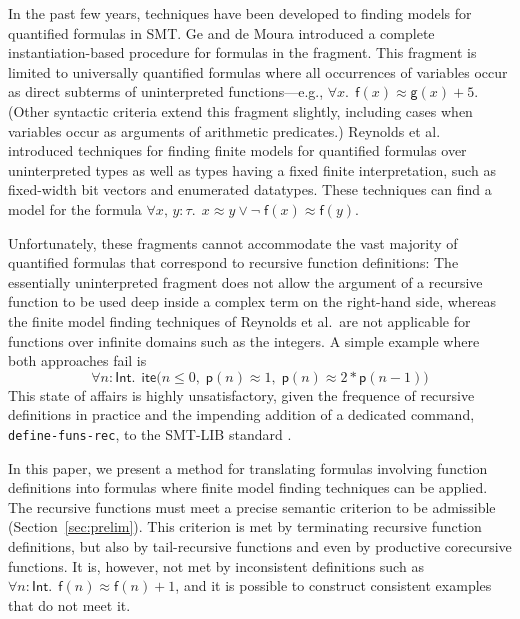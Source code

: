 \documentclass[runningheads,a4paper]{llncs}
\newcommand{\con}[1]{\mathsf{#1}}
\let\oldneg=\neg
\def\neg{\oldneg\;}
\let\oldvee=\vee
\def\vee{\mathrel{\oldvee}}
\newcommand{\teq}{\approx}
\newcommand{\sortint}{\ty{Int}}
\newcommand\ty[1]{\con{#1}}
\newcommand{\lite}{\con{ite}}
\newcommand{\vthinspace}{\kern+0.083333em}
\newcommand{\typ}[1]{^{\vthinspace #1}}
\begin{document}
In the past few years, techniques have been developed to finding models for
quantified formulas in SMT.
Ge and de Moura \cite{GeDeM-CAV-09} introduced a complete instantiation-based
procedure for formulas in the  fragment.
This fragment is limited to universally quantified formulas where all
occurrences of variables occur as direct subterms of uninterpreted
functions---e.g., $\forall x%
.\;\, \con{f}( x )
\teq \con{g}( x ) + 5$.
(Other syntactic criteria extend
this fragment slightly, including cases when variables occur as arguments of
arithmetic predicates.) Reynolds et al.\
\cite{ReyEtAl-1-RR-13,reynolds-et-al-2013} introduced techniques for finding finite
models for quantified
formulas over uninterpreted types as well as types having a fixed finite
interpretation, such as fixed-width bit vectors and enumerated datatypes.
These techniques can
find a model for the formula $\forall x,\, y : \tau.\;\, x \teq
y \vee \neg \con{f}( x ) \teq \con{f}( y )$.

Unfortunately, these fragments cannot accommodate the vast majority of
quantified formulas that correspond to recursive function definitions: The
essentially uninterpreted fragment does not allow the argument of a
recursive function to be used deep inside a complex term on the right-hand side,
whereas the finite model finding techniques of Reynolds et al.\ are not
applicable for functions over infinite domains such as the integers. A simple
example where both approaches fail is
$$\forall n : {\sortint}.\;\, \lite\bigl(
n \leq 0,\allowbreak\; \con{p}( n ) \teq 1,\allowbreak\; \con{p}( n ) \teq 2 * \con{p}( n - 1 ) \bigr)$$
This state of affairs is highly unsatisfactory, given the frequence of
recursive definitions in practice and the impending addition of a dedicated
command, \texttt{define-funs-rec}, to the SMT-LIB standard \cite{smtlib25}.

In this paper, we present a method for translating formulas involving function
definitions into formulas where finite model finding techniques can be applied.
The recursive functions must meet a precise semantic criterion to be admissible
(Section~\ref{sec:prelim}). This criterion is met by terminating recursive
function definitions, but also by tail-recursive functions and even by
productive corecursive functions. It is, however, not met by inconsistent
definitions such as $\forall n : {\sortint}.\;\, \con{f}(n) \teq \con{f}(n) +
1$, and it is possible to construct consistent examples that do not meet it.
\end{document}
